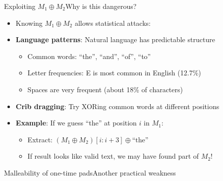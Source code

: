 \documentclass[aspectratio=169, lualatex, handout]{beamer}
\begin{document}
\begin{frame}{Exploiting $M_1 \oplus M_2$}{Why is this dangerous?}
	\begin{itemize}[<+->]
		\item Knowing $M_1 \oplus M_2$ allows statistical attacks:
		\item \textbf{Language patterns}: Natural language has predictable structure
		      \begin{itemize}[<+->]
			      \item Common words: ``the'', ``and'', ``of'', ``to''
			      \item Letter frequencies: E is most common in English (12.7\%)
			      \item Spaces are very frequent (about 18\% of characters)
		      \end{itemize}
		\item \textbf{Crib dragging}: Try XORing common words at different positions
		\item \textbf{Example}: If we guess ``the'' at position $i$ in $M_1$:
		      \begin{itemize}[<+->]
			      \item Extract: $(M_1 \oplus M_2)[i:i+3] \oplus \text{``the''}$
			      \item If result looks like valid text, we may have found part of $M_2$!
		      \end{itemize}
	\end{itemize}
\end{frame}

\begin{frame}{Malleability of one-time pads}{Another practical weakness}
	\begin{columns}[c]
	\end{columns}
\end{frame}
\end{document}
